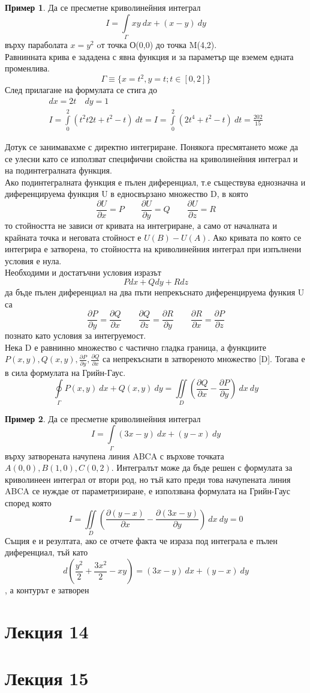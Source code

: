 \documentclass[a4paper,fleqn,12pt]{article}
\theoremstyle{definition}
\newtheorem{example}{Пример}[subsection]
\begin{document}
\begin{example}
Да се пресметне криволинейния интеграл 
$$I = \int\limits_{\Gamma} xy \ dx + (x-y) \ dy$$
върху параболата $x = y^2$ oт точка О(0,0) до точка M(4,2). \\
Равнинната крива е зададена с явна функция и за параметър ще вземем едната променлива. 
$$\Gamma \equiv \{ x = t^2, y=t; t \in [0,2]\}$$
След прилагане на формулата се стига до 
\begin{gather*}
dx = 2t \quad dy = 1\\
I = \int\limits_0 ^2 \left(t^2 t 2t + t^2 - t \right) \ dt = I = \int\limits_0 ^2 \left(2t^4 + t^2 - t \right) \ dt = \frac{202}{15}
\end{gather*}
\end{example}
Дотук се занимавахме с директно интегриране. 
Понякога пресмятането може да се улесни като се използват специфични свойства на криволинейния интеграл и на подинтегралната функция. \\
Ако подинтегралната функция е пълен диференциал, т.е съществува еднозначна и диференцируема функция U в едносвързано множество D, в която 
$$\frac{\partial U}{\partial x} = P \qquad \frac{\partial U}{\partial y} = Q \qquad \frac{\partial U}{\partial z} = R $$
то стойността не зависи от кривата на интегриране, а само от началната и крайната точка и неговата стойност е $U(B) - U(A)$.
Ако кривата по която се интегрира е затворена, то стойността на криволинейния интеграл при изпълнени условия е нула. \\
Необходими и достатъчни условия изразът
$$P dx + Q dy + R dz$$
да бъде пълен диференциал на два пъти непрекъснато диференцируема функия U са
$$\frac{\partial P}{\partial y} = \frac{\partial Q}{\partial x} \qquad 
\frac{\partial Q}{\partial z} = \frac{\partial R}{\partial y} \qquad 
\frac{\partial R}{\partial x} = \frac{\partial P}{\partial z}$$
познато като условия за интегруемост. \\
Нека D е равнинно множество с частично гладка граница, а функциите $P(x,y), Q(x,y), \frac{\partial P}{\partial y}, \frac{\partial Q}{\partial x}$ са непрекъснати в затвореното множество [D]. 
Тогава е в сила формулата на Грийн-Гаус.
$$\oint\limits_{\Gamma} P(x,y) \ dx + Q (x,y) \ dy = 
\iint\limits_{D} \left( \frac{\partial Q}{\partial x} - \frac{\partial P}{\partial y}\right) \ dx \ dy$$

\begin{example}
Да се пресметне криволинейния интеграл
$$I = \int\limits_{\Gamma} (3x- y) \ dx + (y-x) \ dy$$
върху затворената начупена линия ABCA с върхове точката $A(0,0), B(1,0), C(0,2)$. 
Интегралът може да бъде решен с формулата за криволинеен интеграл от втори род, но тъй като преди това начупената линия ABCA се нуждае от параметризиране, е използвана формулата на Грийн-Гаус според която 
$$I = \iint\limits_{D}  \left( \frac{\partial (y-x)}{\partial x} - \frac{\partial (3x-y)}{\partial y}\right) \ dx \ dy = 0$$
Същия е и резултата, ако се отчете факта че израза под интеграла е пълен диференциал, тъй като
$$d \left(\frac{y^2}{2} + \frac{3x^2}{2} - xy\right) = (3x- y) \ dx + (y-x) \ dy$$, 
а контурът е затворен 
\end{example}


\newpage
\section{Лекция 14}

\newpage
\section{Лекция 15}
\end{document}
